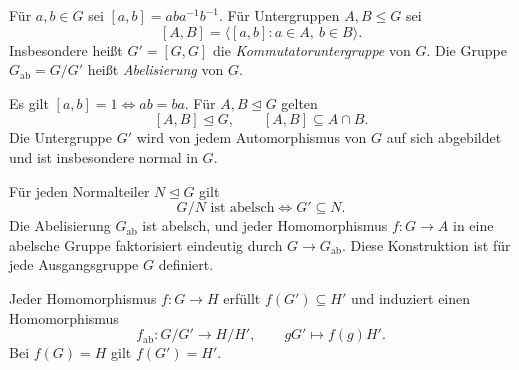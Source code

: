 \begin{definition}
Für \(a,b\in G\) sei \([a,b]=aba^{-1}b^{-1}\).
Für Untergruppen \(A,B\leq G\) sei
\[
 [A,B]=\langle [a,b]:a\in A,\ b\in B\rangle.
\]
Insbesondere heißt \(G'=[G,G]\) die \emph{Kommutatoruntergruppe}
von \(G\). Die Gruppe \(G_{\mathrm{ab}}=G/G'\) heißt
\emph{Abelisierung} von \(G\).
\end{definition}

\begin{theorem}
Es gilt \([a,b]=1\iff ab=ba\).
Für \(A,B\trianglelefteq G\) gelten
\[
 [A,B]\trianglelefteq G,\qquad [A,B]\subseteq A\cap B.
\]
Die Untergruppe \(G'\) wird von jedem Automorphismus von \(G\)
auf sich abgebildet und ist insbesondere normal in \(G\).
\cite{milne}
\end{theorem}

\begin{theorem}
Für jeden Normalteiler \(N\trianglelefteq G\) gilt
\[
 G/N\text{ ist abelsch}\iff G'\subseteq N.
\]
Die Abelisierung \(G_{\mathrm{ab}}\) ist abelsch, und jeder
Homomorphismus \(f:G\to A\) in eine abelsche Gruppe faktorisiert
eindeutig durch \(G\to G_{\mathrm{ab}}\).
Diese Konstruktion ist für jede Ausgangsgruppe \(G\) definiert.
\cite{milne}
\end{theorem}

\begin{theorem}
Jeder Homomorphismus \(f:G\to H\) erfüllt \(f(G')\subseteq H'\)
und induziert einen Homomorphismus
\[
 f_{\mathrm{ab}}:G/G'\longrightarrow H/H',\qquad
 gG'\longmapsto f(g)H'.
\]
Bei \(f(G)=H\) gilt \(f(G')=H'\). \cite{milne}
\end{theorem}
